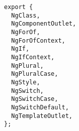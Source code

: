 \begin{verbatim}
export {
  NgClass,
  NgComponentOutlet,
  NgForOf,
  NgForOfContext,
  NgIf,
  NgIfContext,
  NgPlural,
  NgPluralCase,
  NgStyle,
  NgSwitch,
  NgSwitchCase,
  NgSwitchDefault,
  NgTemplateOutlet,
};
\end{verbatim}
